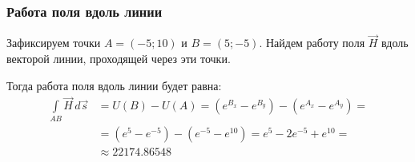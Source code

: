 \begin{frame}\frametitle{Работа поля вдоль линии}
	Зафиксируем точки \(A = (-5; 10)\) и \(B = (5; -5)\).
	Найдем работу поля $\vec H$ вдоль векторой линии,
	проходящей через эти точки.

	Тогда работа поля вдоль линии будет равна:
	\begin{align*}
		\int\limits_{AB} \vec H \, d \vec s
		 & =
		U(B) - U(A)
		=
		(e^{B_x} - e^{B_y}) - (e^{A_x} - e^{A_y}) = \\
		 & = (e^5 - e^{-5}) - (e^{-5} - e^{10}) =
		e^5 - 2 e^{-5} + e^{10} =                   \\
		 & \approx 22174.86548
		\label{eq:work_across_line}
	\end{align*}
\end{frame}
